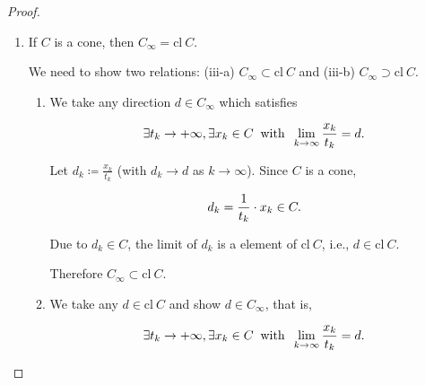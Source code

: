 \documentclass[a4paper,11pt]{jsarticle}
\newcommand{\NaturalNumberSet}{\mathbb{N}}
\begin{document}
\begin{proof}
\begin{enumerate}[label=\roman*,align=CenterWithParen]
\begin{enumerate}[label=ii-\alph*,align=CenterWithParen2]
        Also, we let $m_0 \coloneqq \:\text{max}\:\{\bar{m},\hat{m}, \tilde{m}\} \in \NaturalNumberSet$. By using triangle inequality,

        \begin{equation}
            \forall \epsilon > 0, \exists m_0 \in \NaturalNumberSet \:s.t.\: \forall m \geq \bar{m}, ||\frac{y_m}{t_m} -d|| < \epsilon.\notag
        \end{equation}

        ($\because ||\frac{y_m}{t_m} -d|| \leq \frac{1}{|t_m|} \cdot ||y_m - d_m|| + ||\frac{y_m}{t_m} - d|| < \epsilon. \notag $)

        Therefore $(\text{cl}\:C)_{\infty} \subset C_{\infty}$.

      \end{enumerate}
      Then (ii)'s proof is also completed.
    \item If $C$ is a cone, then $C_{\infty} = \text{cl}\:C$.

    We need to show two relations: (iii-a) $C_{\infty} \subset \text{cl}\:C$ and (iii-b) $C_{\infty} \supset  \text{cl}\:C$.

    \begin{enumerate}[label=iii-\alph*,align=CenterWithParen2]
      \item We take any direction $d \in C_{\infty}$ which satisfies

      \begin{equation}
        \exists t_k \rightarrow + \infty , \exists x_k \in C \:\text{ with }\: \lim_{k \to \infty} \frac{x_k}{t_k} = d. \notag
      \end{equation}

      Let $d_k \coloneqq \frac{x_k}{t_k}$ (with $d_k \rightarrow d$ as $k \rightarrow \infty$). Since $C$ is a cone,

      \begin{equation}
        d_k = \frac{1}{t_k} \cdot x_k \in C. \notag
      \end{equation}

      Due to $d_k \in C$, the limit of $d_k$ is a element of $\text{cl}\:C$, i.e., $d \in \text{cl}\:C$.

      Therefore $C_{\infty} \subset \text{cl}\:C$.

      \item We take any $d \in \text{cl}\:C$ and show $d \in C_{\infty}$, that is,

      \begin{equation}
        \exists t_k \rightarrow + \infty , \exists x_k \in C \:\text{ with }\: \lim_{k \to \infty} \frac{x_k}{t_k} = d. \notag
      \end{equation}


\end{enumerate}
\end{enumerate}
\end{proof}
\end{document}

